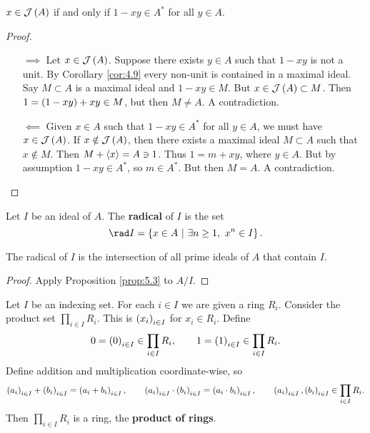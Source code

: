 \begin{proposition}
$ x \in \JJJ\br{A} $ if and only if $ 1 - xy \in A^* $ for all $ y \in A $.
\end{proposition}

\begin{proof}
\hfill
\begin{itemize}
\item[$ \implies $] Let $ x \in \JJJ\br{A} $. Suppose there exists $ y \in A $ such that $ 1 - xy $ is not a unit. By Corollary \ref{cor:4.9} every non-unit is contained in a maximal ideal. Say $ M \subset A $ is a maximal ideal and $ 1 - xy \in M $. But $ x \in \JJJ\br{A} \subset M $. Then $ 1 = \br{1 - xy} + xy \in M $, but then $ M \ne A $. A contradiction.
\item[$ \impliedby $] Given $ x \in A $ such that $ 1 - xy \in A^* $ for all $ y \in A $, we must have $ x \in \JJJ\br{A} $. If $ x \notin \JJJ\br{A} $, then there exists a maximal ideal $ M \subset A $ such that $ x \notin M $. Then $ M + \left\langle x \right\rangle = A \ni 1 $. Thus $ 1 = m + xy $, where $ y \in A $. But by assumption $ 1 - xy \in A^* $, so $ m \in A^* $. But then $ M = A $. A contradiction.
\end{itemize}
\end{proof}

\begin{definition}
Let $ I $ be an ideal of $ A $. The \textbf{radical} of $ I $ is the set
$$ \rad I = \cbr{x \in A \st \exists n \ge 1, \ x^n \in I}. $$
\end{definition}

\begin{proposition}
The radical of $ I $ is the intersection of all prime ideals of $ A $ that contain $ I $.
\end{proposition}

\begin{proof}
Apply Proposition \ref{prop:5.3} to $ A / I $.
\end{proof}


\begin{definition}
Let $ I $ be an indexing set. For each $ i \in I $ we are given a ring $ R_i $. Consider the product set $ \prod_{i \in I} R_i $. This is $ \br{x_i}_{i \in I} $ for $ x_i \in R_i $. Define
$$ 0 = \br{0}_{i \in I} \in \prod_{i \in I} R_i, \qquad 1 = \br{1}_{i \in I} \in \prod_{i \in I} R_i. $$
Define addition and multiplication coordinate-wise, so
$$ \br{a_i}_{i \in I} + \br{b_i}_{i \in I} = \br{a_i + b_i}_{i \in I}, \qquad \br{a_i}_{i \in I} \cdot \br{b_i}_{i \in I} = \br{a_i \cdot b_i}_{i \in I}, \qquad \br{a_i}_{i \in I}, \br{b_i}_{i \in I} \in \prod_{i \in I} R_i. $$
Then $ \prod_{i \in I} R_i $ is a ring, the \textbf{product of rings}.
\end{definition}

